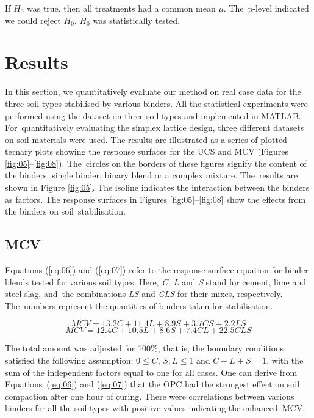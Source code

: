 \documentclass[electronics,article,accept,pdftex,moreauthors]{Definitions/mdpi}
\begin{document}
If $H_0$ was true, then all treatments had a common mean $\mu$. The~p-level indicated {we could reject} $H_0${. }$H_0$ was statistically tested{.} 

\section{Results}
{In this section, we quantitatively evaluate our method on real case data for the three soil types stabilised by various binders. All the statistical experiments were performed using the dataset on three soil types and implemented in MATLAB. For~quantitatively evaluating the simplex lattice design, three different datasets on soil materials were used. The} results are illustrated as a series of plotted ternary plots showing {the} response surfaces for {the} UCS and MCV ({Figures} \ref{fig:05}--\ref{fig:08}). The~circles on the borders of these figures signify {the content of the binders:} single binder, binary blend or a complex mixture. The~results {are shown} in {Figure} \ref{fig:05}. {The isoline indicates the} interaction between{ the }binders as {factors}.{ The }response surfaces in {Figures} \ref{fig:05}--\ref{fig:08}{ }show the effects from the binders on soil~stabilisation. 

\subsection{MCV}
{Equations} (\ref{eq:06}) and (\ref{eq:07}) {refer to the} response surface equation for binder blends tested for {various} soil types. Here, \emph{C, L} and \emph{S} %
stand for cement, lime and steel slag, and~the combinations \emph{LS} and \emph{CLS} for their mixes, respectively. The~numbers represent the quantities of binders taken for stabilisation.

\begin{equation}\label{eq:06}
	MCV=13.2C+11.4L+8.9S+3.7CS+2.2LS
\end{equation}
\begin{equation}\label{eq:07}
	MCV=12.4C+10.5L+8.6S+7.4CL+22.5CLS
\end{equation}

The total amount was adjusted for 100\%, that is, the boundary conditions satisfied the following assumption:  $0 \le C$, $S, L \le 1$ and $C+L+S = 1$, {with the }sum of the independent {factors equal to} one for all cases. One can derive from Equations~(\ref{eq:06}) and (\ref{eq:07}) that {the OPC} had the {strongest effect} on soil compaction after one hour of {curing}. There were correlations between various binders for all the soil types with{ }positive {values} indicating the {enhanced}~MCV.
\end{document}
